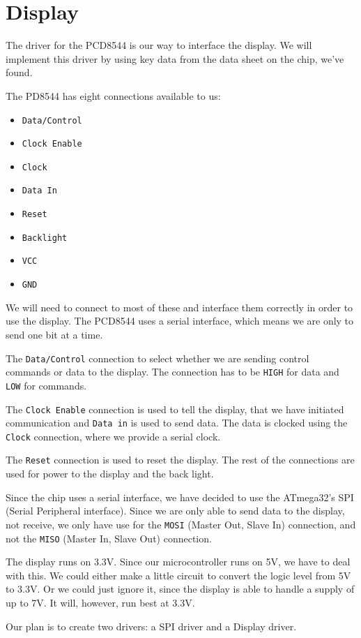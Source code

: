 \section{Display}

The driver for the PCD8544 is our way to interface the display. We will implement this driver by using key data from the data sheet on the chip, we've found.

The PD8544 has eight connections available to us\cite{philips:pcd8544}:
\begin{itemize}
\item \texttt{Data/Control}
\item \texttt{Clock Enable}
\item \texttt{Clock}
\item \texttt{Data In}
\item \texttt{Reset}
\item \texttt{Backlight}
\item \texttt{VCC}
\item \texttt{GND}
\end{itemize}

We will need to connect to most of these and interface them correctly in order to use the display. The PCD8544 uses a serial interface, which means we are only to send one bit at a time.

The \texttt{Data/Control} connection to select whether we are sending control commands or data to the display. The connection has to be \texttt{HIGH} for data and \texttt{LOW} for commands\cite{philips:pcd8544}.

The \texttt{Clock Enable} connection is used to tell the display, that we have initiated communication and \texttt{Data in} is used to send data. The data is clocked using the \texttt{Clock} connection, where we provide a serial clock.

The \texttt{Reset} connection is used to reset the display. The rest of the connections are used for power to the display and the back light.

Since the chip uses a serial interface, we have decided to use the ATmega32's SPI (Serial Peripheral interface). 
Since we are only able to send data to the display, not receive, we only have use for the \texttt{MOSI} (Master Out, Slave In) connection, and not the \texttt{MISO} (Master In, Slave Out) connection.

The display runs on 3.3V. Since our microcontroller runs on 5V, we have to deal with this. 
We could either make a little circuit to convert the logic level from 5V to 3.3V. Or we could just ignore it, since the display is able to handle a supply of up to 7V. It will, however, run best at 3.3V.

Our plan is to create two drivers: a SPI driver and a Display driver.


